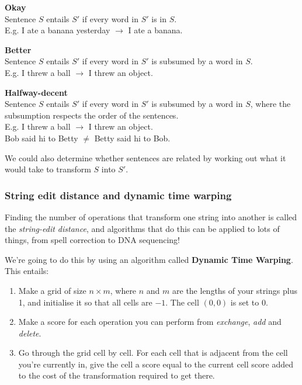 \begin{description}
  \item \textbf{Okay}\\
    Sentence $S$ entails $S'$ if every word in $S'$ is in $S$.\\
    E.g. I ate a banana yesterday $\rightarrow$ I ate a banana.
  \item \textbf{Better}\\
    Sentence $S$ entails $S'$ if every word in $S'$ is subsumed by a word in
    $S$.\\
    E.g. I threw a ball $\rightarrow$ I threw an object.
  \item \textbf{Halfway-decent}\\
    Sentence $S$ entails $S'$ if every word in $S'$ is subsumed by a word in
    $S$, where the subsumption respects the order of the sentences.\\
    E.g. I threw a ball $\rightarrow$ I threw an object.\\
    Bob said hi to Betty $\neq$ Betty said hi to Bob.
\end{description}

We could also determine whether sentences are related by working out what it
would take to transform $S$ into $S'$. 

\subsubsection{String edit distance and dynamic time warping}

Finding the number of operations that transform one string into another is
called the \textit{string-edit distance}, and algorithms that do this can be
applied to lots of things, from spell correction to DNA sequencing!

We're going to do this by using an algorithm called \textbf{Dynamic Time
Warping}. This entails:

\begin{enumerate}
  \item Make a grid of size $n \times m$, where $n$ and $m $ are the lengths of
    your strings plus 1, and initialise it so that all cells are $-1$. The cell
    $(0,0)$ is set to $0$.
  \item Make a score for each operation you can perform from \textit{exchange},
    \textit{add} and \textit{delete}.
  \item Go through the grid cell by cell. For each cell that is adjacent from
    the cell you're currently in, give the cell a score equal to the current
    cell score added to the cost of the transformation required to get there.
\end{enumerate}

